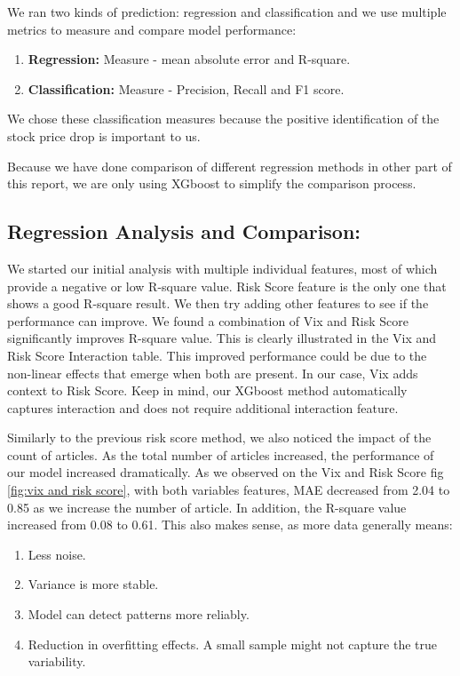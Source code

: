 \documentclass[twocolumn]{article}
\begin{document}
We ran two kinds of prediction: regression and classification and we use multiple metrics to measure and compare model performance:
\begin{enumerate}
    \item \textbf{Regression:} Measure - mean absolute error and R-square.
    \item \textbf{Classification:} Measure - Precision, Recall and F1 score.
\end{enumerate}
We chose these classification measures because the positive identification of the stock price drop is important to us. 

Because we have done comparison of different regression methods in other part of this report, we are only using XGboost to simplify the comparison process. 

\subsection{Regression Analysis and Comparison:}
We started our initial analysis with multiple individual features, most of which provide a negative or low R-square value. Risk Score feature is the only one that shows a good R-square result. We then try adding other features to see if the performance can improve. We found a combination of Vix and Risk Score significantly improves R-square value. This is clearly illustrated in the Vix and Risk Score Interaction table.  This improved performance could be due to the non-linear effects that emerge when both are present. In our case, Vix adds context to Risk Score. Keep in mind, our XGboost method automatically captures interaction and does not require additional interaction feature. 

Similarly to the previous risk score method, we also noticed the impact of the count of articles. As the total number of articles increased, the performance of our model increased dramatically. As we observed on the Vix and Risk Score fig \ref{fig:vix and risk score}, with both variables features, MAE decreased from 2.04 to 0.85 as we increase the number of article. In addition, the R-square value increased from 0.08 to 0.61. This also makes sense, as more data generally means:
\begin{enumerate}
    \item \text Less noise.
    \item \text Variance is more stable.
    \item \text Model can detect patterns more reliably.
    \item \text Reduction in overfitting effects. A small sample might not capture the true variability.
\end{enumerate}
\end{document}
